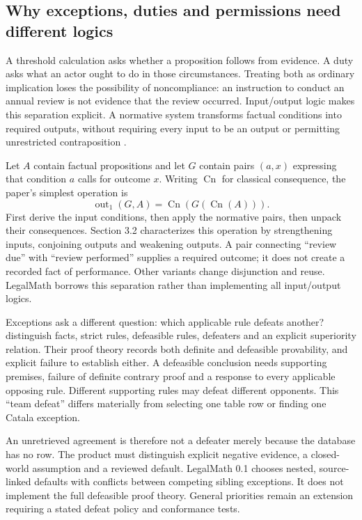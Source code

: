\subsection{Why exceptions, duties and permissions need different logics}

A threshold calculation asks whether a proposition follows from evidence. A duty
asks what an actor ought to do in those circumstances. Treating both as ordinary
implication loses the possibility of noncompliance: an instruction to conduct an
annual review is not evidence that the review occurred. Input/output logic makes
this separation explicit. A normative system transforms factual conditions into
required outputs, without requiring every input to be an output or permitting
unrestricted contraposition \citep[secs.~2--3]{inputoutput2000}.

Let $A$ contain factual propositions and let $G$ contain pairs $(a,x)$ expressing
that condition $a$ calls for outcome $x$. Writing $\operatorname{Cn}$ for classical
consequence, the paper's simplest operation is
\begin{equation}
 \operatorname{out}_1(G,A)
 =\operatorname{Cn}\!\left(G\!\left(\operatorname{Cn}(A)\right)\right).
 \label{eq:io}
\end{equation}
First derive the input conditions, then apply the normative pairs, then unpack
their consequences. Section 3.2 characterizes this operation by strengthening
inputs, conjoining outputs and weakening outputs. A pair connecting ``review
due'' with ``review performed'' supplies a required outcome; it does not create
a recorded fact of performance. Other variants change disjunction and reuse.
LegalMath borrows this separation rather than implementing all input/output logics.

Exceptions ask a different question: which applicable rule defeats another?
\citet[sec.~2]{defeasible2000} distinguish facts, strict rules, defeasible rules,
defeaters and an explicit superiority relation. Their proof theory records both
definite and defeasible provability, and explicit failure to establish either.
A defeasible conclusion needs supporting premises, failure of definite contrary
proof and a response to every applicable opposing rule. Different supporting
rules may defeat different opponents. This ``team defeat'' differs materially
from selecting one table row or finding one Catala exception.

An unretrieved agreement is therefore not a defeater merely because the database
has no row. The product must distinguish explicit negative evidence, a
closed-world assumption and a reviewed default. LegalMath 0.1 chooses nested,
source-linked defaults with conflicts between competing sibling exceptions. It
does not implement the full defeasible proof theory. General priorities remain
an extension requiring a stated defeat policy and conformance tests.

